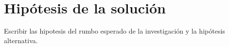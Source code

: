 
\chapter{Hipótesis de la solución}
\ifpdf
    \graphicspath{{Chapter1/Chapter1Figs/PNG/}{Chapter1/Chapter1Figs/PDF/}{Chapter1/Chapter1Figs/}}
\else
    \graphicspath{{Chapter1/Chapter1Figs/EPS/}{Chapter1/Chapter1Figs/}}
\fi

Escribir las hipotesis del rumbo esperado de la investigación y la hipótesis alternativa.




